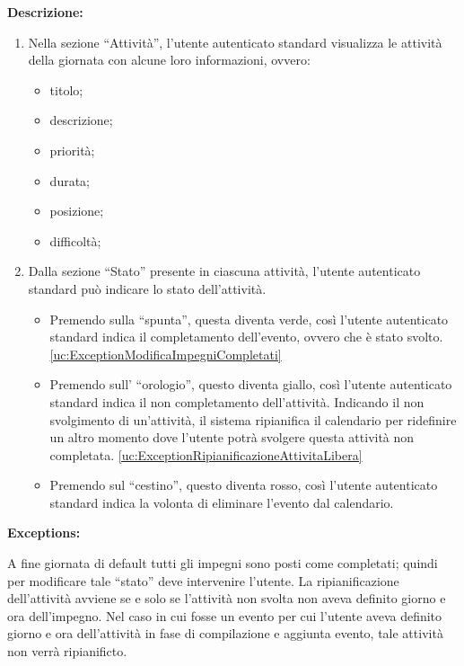 \begin{listaPersonale}[UC]{}
    \textbf{Descrizione:}
    \begin{enumerate}
        \item Nella sezione “Attività”, l'utente autenticato standard visualizza le attività della giornata con alcune loro informazioni, ovvero:
              \begin{itemize}
                  \item titolo;
                  \item descrizione;
                  \item priorità;
                  \item durata;
                  \item posizione;
                  \item difficoltà;
              \end{itemize}
        \item Dalla sezione “Stato” presente in ciascuna attività, l'utente autenticato standard può indicare lo stato dell'attività.
              \begin{itemize}
                  \item Premendo sulla “spunta”, questa diventa verde, così l'utente autenticato standard indica il completamento dell'evento, ovvero che è stato svolto. \ref{uc:ExceptionModificaImpegniCompletati}
                  \item Premendo sull' “orologio”, questo diventa giallo, così l'utente autenticato standard indica il non completamento dell'attività. Indicando il non svolgimento di un'attività, il sistema ripianifica il calendario per ridefinire un altro momento dove l'utente potrà svolgere questa attività non completata. \ref{uc:ExceptionRipianificazioneAttivitaLibera}
                  \item Premendo sul “cestino”, questo diventa rosso, così l'utente autenticato standard indica la volonta di eliminare l'evento dal calendario.
              \end{itemize}

    \end{enumerate}



    \textbf{Exceptions:}
    \begin{enumerate}[label=\textbf{[exception \arabic{enumii}]}, ref= \textbf{[exception \arabic{enumii}]}]
         A fine giornata di default tutti gli impegni sono posti come completati; quindi per modificare tale “stato” deve intervenire l'utente.
         La ripianificazione dell'attività avviene se e solo se l'attività non svolta non aveva definito giorno e ora dell'impegno. Nel caso in cui fosse un evento per cui l'utente aveva definito giorno e ora dell'attività in fase di compilazione e aggiunta evento, tale attività non verrà ripianificto.
    \end{enumerate}


\end{listaPersonale}
